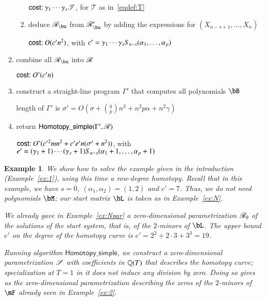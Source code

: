 \documentclass[amsthm]{elsart}
\newtheorem{example}[definition]{Example}
\begin{document}
\begin{algorithm}[!t]
\begin{enumerate}
\begin{enumerate}
\hfill  $\text{\sf{cost:~}} \gamma_1 \cdots \gamma_s \mathscr{T}$, for $\mathscr{T}$ as in~\eqref{eqdef:T}

\item deduce $\scrR_\bu$ from $\scrR'_\bu$ by adding the expressions for $(X_{n-s+1},\dots,X_n)$
  
\hfill  $\text{\sf{cost:~}} O( {c'}{} n^2)$, with ${c'}{}= \gamma_1 \cdots \gamma_s S_{n-s}(\alpha_1,\dots,\alpha_p)$
\end{enumerate}
\item combine all $\scrR_\bu$ into $\mathscr{R}$

  \hfill $\text{\sf{cost:~}} {O}{\,\tilde{ }\,}( {c'}{} n)$

\item construct a straight-line program $\Gamma'$ that computes all polynomials $\bB$

  \hfill length of $\Gamma'$ is $\sigma'=O(\sigma + {q \choose p} n^3 + n^2 p \alpha + n^2\gamma)$

\item\label{step:final:rowdegreesimple} return $\mathsf{Homotopy\_simple}(\Gamma',\mathscr{R})$

  \hfill $\text{\sf{cost:~}} {O}{\,\tilde{ }\,}( {c'}{}^2 m n^2 + {c'}{} {e'}{} n (\sigma'  + n^2))$, 
with ${e'}{}=(\gamma_1+1) \cdots (\gamma_s+1) S_{n-s}(\alpha_1+1,\dots,\alpha_p+1)$
\end{enumerate}
\label{RowHom_simple}
\end{algorithm}



\begin{example}
  We show how to solve the example given in the introduction
  (Example~\ref{ex:1}), using this time a row-degree homotopy. Recall
  that in this example, we have $s=0$, $(\alpha_1,\alpha_2)=(1,2)$ and
  $c'=7$.  Thus, we do not need polynomials $\bM$; our start matrix
  $\bL$ is taken as in Example~\ref{ex:N}.

  We already gave in Example~\ref{ex:Npar} a zero-dimensional
  parametrization $\mathscr{R}_0$ of the solutions of the start system, that is, of
  the $2$-minors of $\bL$. The upper bound $e'$ on the degree 
  of the homotopy curve is $e'=2^2 + 2\cdot 3 + 3^3=19$.

  Running algorithm $\mathsf{Homotopy\_simple}$, we construct a
  zero-dimensional parametrization $\mathscr{S}$ with coefficients in
  $\mathbb{Q}(T)$ that describes the homotopy curve; specialization at $T=1$
  in it does not induce any division by zero. Doing so gives us the
  zero-dimensional parametrization describing the zeros of the
  $2$-minors of $\mF$ already seen in Example~\ref{ex:2}.
\end{example}
\end{document}
